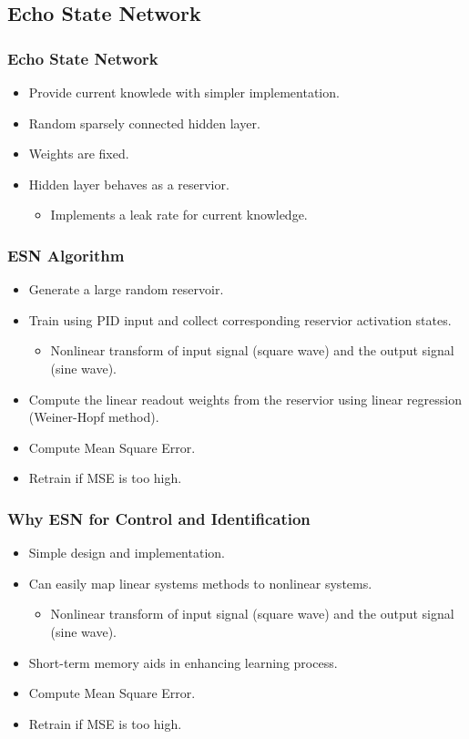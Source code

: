 \documentclass{beamer}
\begin{document}
	\begin{frame}
		\section[Echo State Network]{Echo State Network}
		\frametitle{Echo State Network}
		\begin{itemize}
			\item Provide current knowlede with simpler implementation.
			\item Random sparsely connected hidden layer.
			\item Weights are fixed.
			\item Hidden layer behaves as a reservior.
			\begin{itemize}
				\item Implements a leak rate for current knowledge.
			\end{itemize}
		\end{itemize}
	\end{frame}

	\begin{frame}
		\frametitle{ESN Algorithm}
		\begin{itemize}
			\item Generate a large random reservoir.
			\item Train using PID input and collect corresponding reservior activation states.
			\begin{itemize}
				\item Nonlinear transform of input signal (square wave) and the output signal (sine wave).
			\end{itemize}
			\item Compute the linear readout weights from the reservior using linear regression (Weiner-Hopf method).
			\item Compute Mean Square Error.
			\item Retrain if MSE is too high.
		\end{itemize}
	\end{frame}

	\begin{frame}
		\frametitle{Why ESN for Control and Identification}
		\begin{itemize}
			\item Simple design and implementation.
			\item{Can easily map linear systems methods to nonlinear systems.}
			\begin{itemize}
				\item{Nonlinear transform of input signal (square wave) and the output signal (sine wave).}
			\end{itemize}
			\item Short-term memory aids in enhancing learning process.
			\item Compute Mean Square Error.
			\item Retrain if MSE is too high.
		\end{itemize}
	\end{frame}
\end{document}
